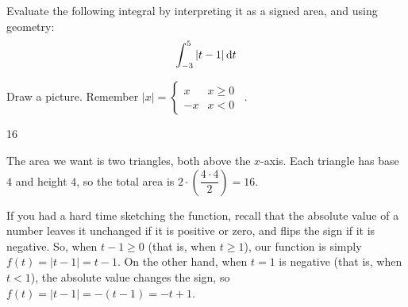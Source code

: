 \begin{Mquestion}
Evaluate the following integral by interpreting it as a signed area, and using geometry:
\[\int_{-3}^5 |t-1| \,\mathrm{d}t\]
\end{Mquestion}
\begin{hint}
Draw a picture. Remember $|x| = \left\{\begin{array}{rc}x&x\ge 0\\-x&x<0\end{array}\right.$\ .
\end{hint}
\begin{answer}
16
\end{answer}
\begin{solution}
The area we want is two triangles, both above the $x$-axis. Each triangle has base $4$ and height $4$, so the total area is $2\cdot\left(\dfrac{4\cdot 4}{2}\right)=16$.
\begin{center}
\end{center}
If you had a hard time sketching the function, recall that the absolute value of a number leaves it unchanged if it is positive or zero, and flips the sign if it is negative. So, when $t-1 \ge 0$ (that is, when $t \ge 1$), our function is simply $f(t)=|t-1|=t-1$. On the other hand, when $t=1$ is negative (that is, when $t<1$), the absolute value changes the sign, so $f(t) = |t-1|=-(t-1)=-t+1$.
\end{solution}

